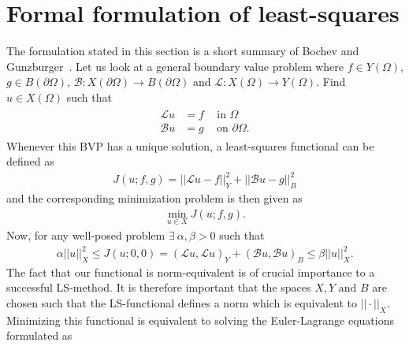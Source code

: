 
\section{Formal formulation of least-squares}
The formulation stated in this section is a short summary of Bochev and Gunzburger~\cite{Bochev}.
Let us look at a general boundary value problem where $f \in Y(\Omega)$, $g \in B(\partial \Omega)$, $\mathcal{B}\colon X(\partial \Omega) \to B(\partial\Omega) $ and $\mathcal{L}\colon X(\Omega)\to Y(\Omega)$. Find $u \in X(\Omega) $ such that 
\begin{align}
	\begin{split}
	\mathcal{L} u &= f \; \; \; \text{ in } \Omega \\
	\mathcal{B}u &= g \; \; \; \text{ on } \partial \Omega.
	\end{split}
	\label{eq:BVP}
\end{align}
Whenever this BVP has a unique solution, a least-squares functional can be defined as 
\begin{align}
	J(u;f,g) = ||\mathcal{L}u-f||^2_Y + ||\mathcal{B}u-g||^2_B
	\label{eq:FunctionalGen}
\end{align}
and the corresponding minimization problem is then given as 
\begin{align}
	\min_{u \in X}J(u;f,g).
	\label{eq:minProbGen}
\end{align}
Now, for any well-posed problem $\exists \: \alpha,\beta > 0$ such that 
\begin{align}
	\alpha||u||_X^2 \leq J(u;0,0) = (\mathcal{L}u,\mathcal{L}u)_Y+(\mathcal{B}u,\mathcal{B}u)_B \leq \beta||u||_X^2.
	\label{eq:normEq}
\end{align}
The fact that our functional is norm-equivalent is of crucial importance to a successful LS-method. It is therefore important that the spaces $X,Y \text{ and } B$ are chosen such that the LS-functional defines a norm which is equivalent to $|| \cdot ||_X$.
Minimizing this functional is equivalent to solving the Euler-Lagrange equations formulated as 
